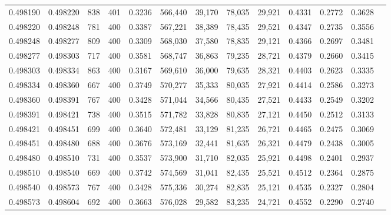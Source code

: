 \begin{tabular}{rrrrrrrrrrrrr}
0.498190 & 0.498220 &    838 & 401 &                                     0.3236 & 566,440 &  39,170 &  78,035 &  29,921 & 0.4331 & 0.2772 & 0.3628 \\
0.498220 & 0.498248 &    781 & 400 &                                     0.3387 & 567,221 &  38,389 &  78,435 &  29,521 & 0.4347 & 0.2735 & 0.3556 \\
0.498248 & 0.498277 &    809 & 400 &                                     0.3309 & 568,030 &  37,580 &  78,835 &  29,121 & 0.4366 & 0.2697 & 0.3481 \\
0.498277 & 0.498303 &    717 & 400 &                                     0.3581 & 568,747 &  36,863 &  79,235 &  28,721 & 0.4379 & 0.2660 & 0.3415 \\
0.498303 & 0.498334 &    863 & 400 &                                     0.3167 & 569,610 &  36,000 &  79,635 &  28,321 & 0.4403 & 0.2623 & 0.3335 \\
0.498334 & 0.498360 &    667 & 400 &                                     0.3749 & 570,277 &  35,333 &  80,035 &  27,921 & 0.4414 & 0.2586 & 0.3273 \\
0.498360 & 0.498391 &    767 & 400 &                                     0.3428 & 571,044 &  34,566 &  80,435 &  27,521 & 0.4433 & 0.2549 & 0.3202 \\
0.498391 & 0.498421 &    738 & 400 &                                     0.3515 & 571,782 &  33,828 &  80,835 &  27,121 & 0.4450 & 0.2512 & 0.3133 \\
0.498421 & 0.498451 &    699 & 400 &                                     0.3640 & 572,481 &  33,129 &  81,235 &  26,721 & 0.4465 & 0.2475 & 0.3069 \\
0.498451 & 0.498480 &    688 & 400 &                                     0.3676 & 573,169 &  32,441 &  81,635 &  26,321 & 0.4479 & 0.2438 & 0.3005 \\
0.498480 & 0.498510 &    731 & 400 &                                     0.3537 & 573,900 &  31,710 &  82,035 &  25,921 & 0.4498 & 0.2401 & 0.2937 \\
0.498510 & 0.498540 &    669 & 400 &                                     0.3742 & 574,569 &  31,041 &  82,435 &  25,521 & 0.4512 & 0.2364 & 0.2875 \\
0.498540 & 0.498573 &    767 & 400 &                                     0.3428 & 575,336 &  30,274 &  82,835 &  25,121 & 0.4535 & 0.2327 & 0.2804 \\
0.498573 & 0.498604 &    692 & 400 &                                     0.3663 & 576,028 &  29,582 &  83,235 &  24,721 & 0.4552 & 0.2290 & 0.2740 \\

\end{tabular}
